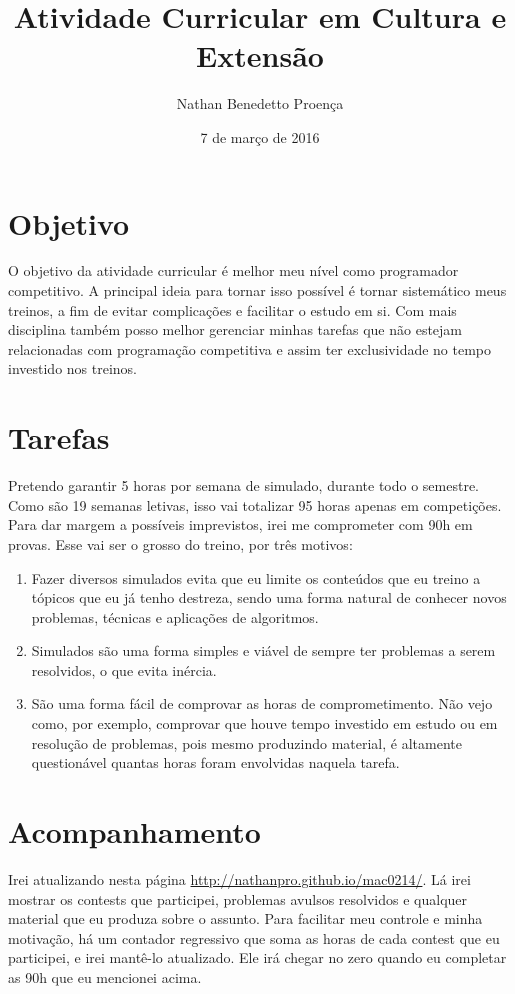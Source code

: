 \documentclass{article}
\title{Atividade Curricular em Cultura e Extensão}
\author{Nathan Benedetto Proença}
\date{7 de março de 2016}
\begin{document}
\maketitle
\section{Objetivo}
    O objetivo da atividade curricular é melhor meu nível como programador
competitivo. A principal ideia para tornar isso possível é tornar sistemático
meus treinos, a fim de evitar complicações e facilitar o estudo em si. Com mais
disciplina também posso melhor gerenciar minhas tarefas que não estejam
relacionadas com programação competitiva e assim ter exclusividade no tempo
investido nos treinos.
\section{Tarefas}
    Pretendo garantir 5 horas por semana de simulado, durante todo o semestre.
Como são 19 semanas letivas, isso vai totalizar 95 horas apenas em competições.
Para dar margem a possíveis imprevistos, irei me comprometer com 90h em provas.
Esse vai ser o grosso do treino, por três motivos:
\begin{enumerate}
    \item Fazer diversos simulados evita que eu limite os conteúdos que eu
treino a tópicos que eu já tenho destreza, sendo uma forma natural de conhecer
novos problemas, técnicas e aplicações de algoritmos.
    \item Simulados são uma forma simples e viável de sempre ter problemas a
serem resolvidos, o que evita inércia.
    \item São uma forma fácil de comprovar as horas de comprometimento. Não vejo
como, por exemplo, comprovar que houve tempo investido em estudo ou em resolução
de problemas, pois mesmo produzindo material, é altamente questionável quantas 
horas foram envolvidas naquela tarefa.
\end{enumerate}
\section{Acompanhamento}
    Irei atualizando nesta página \url{http://nathanpro.github.io/mac0214/}.
Lá irei mostrar os contests que participei, problemas avulsos resolvidos e
qualquer material que eu produza sobre o assunto. Para facilitar meu controle
e minha motivação, há um contador regressivo que soma as horas de cada contest
que eu participei, e irei mantê-lo atualizado. Ele irá chegar no zero quando
eu completar as 90h que eu mencionei acima.
\end{document}
